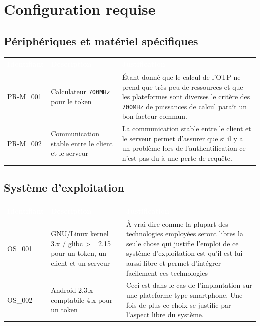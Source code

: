 \documentclass{"../../res/univ-projet"}
\begin{document}
\section{Configuration requise}

\subsection{Périphériques et matériel spécifiques}
\begin{tabular}{|p{}|p{}|p{}|}
    \hline
    \rowcolor{gray}
    \textcolor{white}{\bfseries Identifiant} & 
    \textcolor{white}{\bfseries Description} &
    \textcolor{white}{\bfseries Justification} \\
    \hline
    PR-M\_001 &
    Calculateur \verb?700MHz? pour le token &
    Étant donné que le calcul de l'OTP ne prend que très peu de ressources
            et que les plateformes sont diverses le critère des \verb?700MHz? de puissances
            de calcul paraît un bon facteur commun.\\
    \hline
    PR-M\_002 &
    Communication stable entre le client et le serveur &
    La communication stable entre le client et le serveur permet d'assurer que si
            il y a un problème lors de l'authentification ce n'est pas du à une perte de
            requête.\\
    \hline
\end{tabular}

\subsection{Système d'exploitation}
\begin{tabular}{|p{}|p{}|p{}|}
    \hline
    \rowcolor{gray}
    \textcolor{white}{\bfseries Identifiant} & 
    \textcolor{white}{\bfseries Description} &
    \textcolor{white}{\bfseries Justification} \\
    \hline
    OS\_001& 
    GNU/Linux kernel 3.x / glibc >= 2.15 pour un token, un client et un serveur&
    À vrai dire comme la plupart des technologies employées seront libres
    la seule chose qui justifie l'emploi de ce système d'exploitation
    est qu'il est lui aussi libre et permet d'intégrer facilement ces technologies\\
    \hline
    OS\_002&
    Android 2.3.x comptabile 4.x pour un token&
    Ceci est dans le cas de l'implantation sur une plateforme type
    smartphone. Une fois de plus ce choix se justifie par
    l'aspect libre du système.\\
    \hline
\end{tabular}
\end{document}

